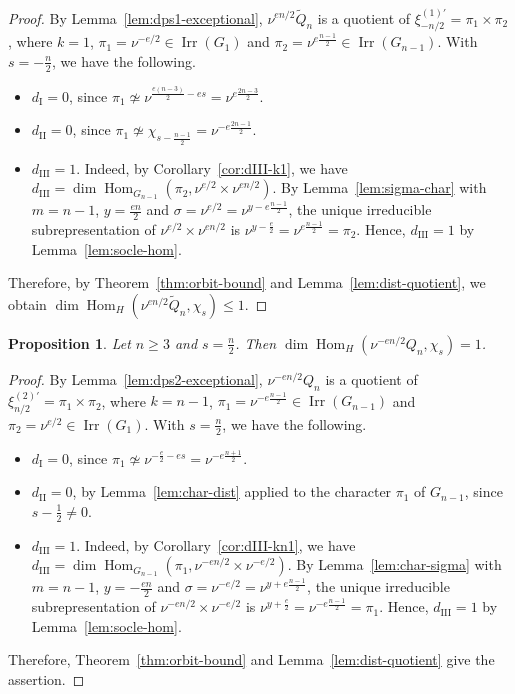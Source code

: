 \documentclass[11pt]{amsart}
\numberwithin{equation}{section}
\theoremstyle{plain}
\newtheorem{proposition}[theorem]{Proposition}
\theoremstyle{definition}
\theoremstyle{remark}
\DeclareMathOperator{\Hom}{Hom}
\DeclareMathOperator{\Irr}{Irr}
\newcommand{\Qt}{\widetilde{Q}}
\newcommand{\dI}{d_{\mathrm{I}}}
\newcommand{\dII}{d_{\mathrm{II}}}
\newcommand{\dIII}{d_{\mathrm{III}}}
\begin{document}
\begin{proof}
	By Lemma~\ref{lem:dps1-exceptional}, $\nu^{en/2}\Qt_n$ is a quotient of $\xi^{(1)\prime}_{-n/2}=\pi_1\times\pi_2$, where $k=1$, $\pi_1=\nu^{-e/2}\in\Irr(G_1)$ and $\pi_2=\nu^{e\frac{n-1}2}\in\Irr(G_{n-1})$. With $s=-\frac n2$, we have the following.
	\begin{itemize}
		\item $\dI=0$, since $\pi_1\not\simeq\nu^{\frac{e(n-3)}2-es}=\nu^{e\frac{2n-3}2}$.
		\item $\dII=0$, since $\pi_1\not\simeq\chi_{s-\frac{n-1}2}=\nu^{-e\frac{2n-1}2}$.
		\item $\dIII=1$. Indeed, by Corollary~\ref{cor:dIII-k1}, we have $\dIII=\dim\Hom_{G_{n-1}}(\pi_2,\nu^{e/2}\times\nu^{en/2})$. By Lemma~\ref{lem:sigma-char} with $m=n-1$, $y=\frac{en}2$ and $\sigma=\nu^{e/2}=\nu^{y-e\frac{n-1}2}$, the unique irreducible subrepresentation of $\nu^{e/2}\times\nu^{en/2}$ is $\nu^{y-\frac e2}=\nu^{e\frac{n-1}2}=\pi_2$. Hence, $\dIII=1$ by Lemma~\ref{lem:socle-hom}.
	\end{itemize}
	Therefore, by Theorem~\ref{thm:orbit-bound} and Lemma~\ref{lem:dist-quotient}, we obtain $\dim\Hom_H(\nu^{en/2}\Qt_n,\chi_s)\le1$.
\end{proof}

\begin{proposition}\label{prop:mult-Qn}
	Let $n\ge3$ and $s=\frac n2$. Then $\dim\Hom_H(\nu^{-en/2}Q_n,\chi_s)=1$.
\end{proposition}

\begin{proof}
	By Lemma~\ref{lem:dps2-exceptional}, $\nu^{-en/2}Q_n$ is a quotient of $\xi^{(2)\prime}_{n/2}=\pi_1\times\pi_2$, where $k=n-1$, $\pi_1=\nu^{-e\frac{n-1}2}\in\Irr(G_{n-1})$ and $\pi_2=\nu^{e/2}\in\Irr(G_1)$. With $s=\frac n2$, we have the following.
	\begin{itemize}
		\item $\dI=0$, since $\pi_1\not\simeq\nu^{-\frac e2-es}=\nu^{-e\frac{n+1}2}$.
		\item $\dII=0$, by Lemma~\ref{lem:char-dist} applied to the character $\pi_1$ of $G_{n-1}$, since $s-\frac12\ne0$.
		\item $\dIII=1$. Indeed, by Corollary~\ref{cor:dIII-kn1}, we have $\dIII=\dim\Hom_{G_{n-1}}(\pi_1,\nu^{-en/2}\times\nu^{-e/2})$. By Lemma~\ref{lem:char-sigma} with $m=n-1$, $y=-\frac{en}2$ and $\sigma=\nu^{-e/2}=\nu^{y+e\frac{n-1}2}$, the unique irreducible subrepresentation of $\nu^{-en/2}\times\nu^{-e/2}$ is $\nu^{y+\frac e2}=\nu^{-e\frac{n-1}2}=\pi_1$. Hence, $\dIII=1$ by Lemma~\ref{lem:socle-hom}.
	\end{itemize}
	Therefore, Theorem~\ref{thm:orbit-bound} and Lemma~\ref{lem:dist-quotient} give the assertion.
\end{proof}
\end{document}
